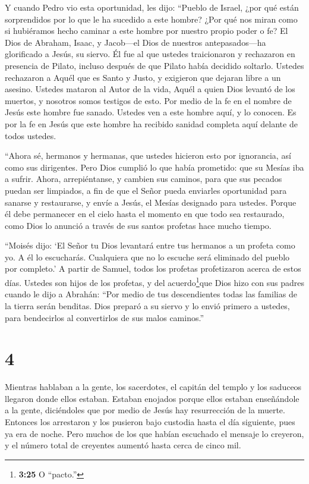  Y cuando Pedro vio esta oportunidad, les dijo: ``Pueblo de
Israel, ¿por qué están sorprendidos por lo que le ha sucedido a este
hombre? ¿Por qué nos miran como si hubiéramos hecho caminar a este
hombre por nuestro propio poder o fe?  El Dios de Abraham,
Isaac, y Jacob---el Dios de nuestros antepasados---ha glorificado a
Jesús, su siervo. Él fue al que ustedes traicionaron y rechazaron en
presencia de Pilato, incluso después de que Pilato había decidido
soltarlo.  Ustedes rechazaron a Aquél que es Santo y Justo,
y exigieron que dejaran libre a un asesino.  Ustedes
mataron al Autor de la vida, Aquél a quien Dios levantó de los muertos,
y nosotros somos testigos de esto.  Por medio de la fe en
el nombre de Jesús este hombre fue sanado. Ustedes ven a este hombre
aquí, y lo conocen. Es por la fe en Jesús que este hombre ha recibido
sanidad completa aquí delante de todos ustedes.

 ``Ahora sé, hermanos y hermanas, que ustedes hicieron esto
por ignorancia, así como sus dirigentes.  Pero Dios cumplió
lo que había prometido: que su Mesías iba a sufrir.  Ahora,
arrepiéntanse, y cambien sus caminos, para que sus pecados puedan ser
limpiados, a fin de que el Señor pueda enviarles oportunidad para
sanarse y restaurarse,  y envíe a Jesús, el Mesías
designado para ustedes.  Porque él debe permanecer en el
cielo hasta el momento en que todo sea restaurado, como Dios lo anunció
a través de sus santos profetas hace mucho tiempo.

 ``Moisés dijo: `El Señor tu Dios levantará entre tus
hermanos a un profeta como yo. A él lo escucharás. 
Cualquiera que no lo escuche será eliminado del pueblo por completo.'
 A partir de Samuel, todos los profetas profetizaron acerca
de estos días.  Ustedes son hijos de los profetas, y del
acuerdo\footnote{\textbf{3:25} O ``pacto.''}que Dios hizo con sus padres
cuando le dijo a Abrahán: ``Por medio de tus descendientes todas las
familias de la tierra serán benditas.  Dios preparó a su
siervo y lo envió primero a ustedes, para bendecirlos al convertirlos de
sus malos caminos.''

\hypertarget{section-3}{%
\section{4}\label{section-3}}

 Mientras hablaban a la gente, los sacerdotes, el capitán
del templo y los saduceos llegaron donde ellos estaban. 
Estaban enojados porque ellos estaban enseñándole a la gente,
diciéndoles que por medio de Jesús hay resurrección de la muerte.
 Entonces los arrestaron y los pusieron bajo custodia hasta
el día siguiente, pues ya era de noche.  Pero muchos de los
que habían escuchado el mensaje lo creyeron, y el número total de
creyentes aumentó hasta cerca de cinco mil.

